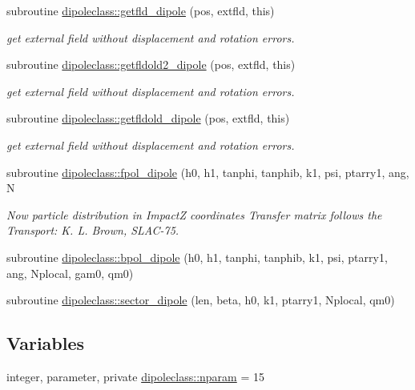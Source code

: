 \begin{DoxyCompactItemize}
subroutine \mbox{\hyperlink{namespacedipoleclass_ac8c755e07904e113f223ee5ef029ac93}{dipoleclass\+::getfld\+\_\+dipole}} (pos, extfld, this)
\begin{DoxyCompactList}\small\item\em get external field without displacement and rotation errors. \end{DoxyCompactList}\item 
subroutine \mbox{\hyperlink{namespacedipoleclass_abab9a0945263c7c75aa7ef9f94c07b9a}{dipoleclass\+::getfldold2\+\_\+dipole}} (pos, extfld, this)
\begin{DoxyCompactList}\small\item\em get external field without displacement and rotation errors. \end{DoxyCompactList}\item 
subroutine \mbox{\hyperlink{namespacedipoleclass_a417b00dd769e534be3746eaeff56c074}{dipoleclass\+::getfldold\+\_\+dipole}} (pos, extfld, this)
\begin{DoxyCompactList}\small\item\em get external field without displacement and rotation errors. \end{DoxyCompactList}\item 
subroutine \mbox{\hyperlink{namespacedipoleclass_ab0dd1e8b5ca921939ce0d97f0bd817ee}{dipoleclass\+::fpol\+\_\+dipole}} (h0, h1, tanphi, tanphib, k1, psi, ptarry1, ang, N
\begin{DoxyCompactList}\small\item\em Now particle distribution in ImpactZ coordinates Transfer matrix follows the Transport\+: K. L. Brown, S\+L\+A\+C-\/75. \end{DoxyCompactList}\item 
subroutine \mbox{\hyperlink{namespacedipoleclass_aecb437418e23046347e41045d2988d3b}{dipoleclass\+::bpol\+\_\+dipole}} (h0, h1, tanphi, tanphib, k1, psi, ptarry1, ang, Nplocal, gam0, qm0)
\item 
subroutine \mbox{\hyperlink{namespacedipoleclass_a2aaba3f2e21950bbcafe3eb744fff547}{dipoleclass\+::sector\+\_\+dipole}} (len, beta, h0, k1, ptarry1, Nplocal, qm0)
\end{DoxyCompactItemize}
\subsection*{Variables}
\begin{DoxyCompactItemize}
\item 
integer, parameter, private \mbox{\hyperlink{namespacedipoleclass_abc619199e1e9a2811da9e97630125da3}{dipoleclass\+::nparam}} = 15
\end{DoxyCompactItemize}


